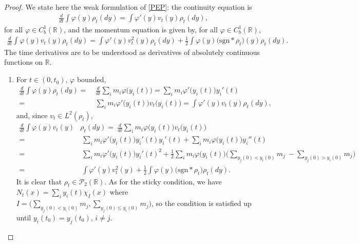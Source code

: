 \documentclass[11pt]{article}
\numberwithin{equation}{section}
\begin{document}
        \begin{proof} We state here the weak formulation of \eqref{PEP}: the continuity equation is 
        \begin{align}\label{continuity-equation}
            \frac{d}{dt}\int\varphi(y)\rho_t(dy)=\int\varphi'(y)v_t(y)\rho_t(dy), 
        \end{align}
        for all $\varphi\in C_b^1(\mathbb{R})$, and the momentum equation is given by, for all $\varphi\in C_b^1(\mathbb{R})$,
        \begin{align}\label{momentumn-equation}
            \frac{d}{dt}\int\varphi(y)v_t(y)\rho_t(dy)=\int\varphi'(y)v_t^2(y)\rho_t(dy)+\frac{1}{2}\int\varphi(y)\big(\text{sgn}*\rho_t\big)(y)\rho_t(dy). 
        \end{align}
        The time derivatives are to be understood as derivatives of absolutely continuous functions 
        on $\mathbb{R}$. 
        \begin{enumerate}
            \item  For $t\in(0,t_0)$, $\varphi$ bounded,
                \begin{align*}
                    \frac{d}{dt}\int\varphi(y)\rho_t(dy)=\ &\frac{d}{dt}\sum_{i}m_i\varphi\big(y_i(t)\big)=\sum_{i}m_i\varphi'\big(y_i(t)\big)y_i'(t)
                    \\
                    =\ &\sum_{i}m_i\varphi'\big(y_i(t)\big)v_t\big(y_i(t)\big)=\int\varphi'(y)v_t(y)\rho_t(dy),
                \end{align*}
                and, since $v_t\in L^2(\rho_t)$,  
                \begin{align*}
                    \frac{d}{dt}\int\varphi(y)v_t(y)&\rho_t(dy)=\ \frac{d}{dt}\sum_{i}m_i\varphi\big(y_i(t)\big)v_t\big(y_i(t)\big)
                    \\
                    =&\ \sum_{i}m_i\varphi'\big(y_i(t)\big)y_i'(t)y_i'(t)+\sum_{i}m_i\varphi\big(y_i(t)\big)y_i''(t)
                    \\
                    =&\ \sum_{i}m_i\varphi'\big(y_i(t)\big)y_i'(t)^2+\frac{1}{2}\sum_{i}m_i\varphi\big(y_i(t)\big)\Big(\sum_{y_j(0)<y_i(0)}m_j\ -\sum_{y_j(0)>y_i(0)}m_j\Big)
                    \\
                    =&\ \int\varphi'(y)v_t^2(y)+\frac{1}{2}\int\varphi(y)\big(\text{sgn}*\rho_t\big)\rho_t(dy). 
                \end{align*}
                It is clear that $\rho_t\in\mathcal{P}_2(\mathbb{R})$. As for the sticky condition, we have $N_t(x)=\sum_{i}y_i(t)\chi_I(x)$ where $I={\big(\sum_{y_j(0)<y_i(0)}m_j,\sum_{y_j(0)\leq y_i(0)}m_j\big)}$, so the condition is satisfied up until $y_i(t_0)=y_j(t_0)$, $i\neq j$. 
           

\end{enumerate}
\end{proof}
\end{document}
